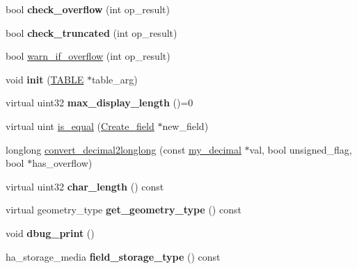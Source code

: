 \begin{DoxyCompactItemize}
\item 
\mbox{\label{classField_a0f30b16148651f543ac6ba6ddb3179f9}} 
bool {\bfseries check\+\_\+overflow} (int op\+\_\+result)
\item 
\mbox{\label{classField_a91ea426d1ddef963ca231392ef91d9ec}} 
bool {\bfseries check\+\_\+truncated} (int op\+\_\+result)
\item 
bool \mbox{\hyperlink{classField_a910faac3cd041daebe318e9dbf1d2297}{warn\+\_\+if\+\_\+overflow}} (int op\+\_\+result)
\item 
\mbox{\label{classField_a6a3873e28497e6928aa29f2a36502570}} 
void {\bfseries init} (\mbox{\hyperlink{structTABLE}{T\+A\+B\+LE}} $\ast$table\+\_\+arg)
\item 
\mbox{\label{classField_a2d0fa60640d919a674c31f5f2f6e3e05}} 
virtual uint32 {\bfseries max\+\_\+display\+\_\+length} ()=0
\item 
virtual uint \mbox{\hyperlink{classField_a8c99e9c66c1d578a339ae87d128843b7}{is\+\_\+equal}} (\mbox{\hyperlink{classCreate__field}{Create\+\_\+field}} $\ast$new\+\_\+field)
\item 
longlong \mbox{\hyperlink{classField_ae7b5281a68791e7d7ba3d5293a68c0cd}{convert\+\_\+decimal2longlong}} (const \mbox{\hyperlink{classmy__decimal}{my\+\_\+decimal}} $\ast$val, bool unsigned\+\_\+flag, bool $\ast$has\+\_\+overflow)
\item 
\mbox{\label{classField_aceaebba0a55dc7d6f09a1a84d8ca87e6}} 
virtual uint32 {\bfseries char\+\_\+length} () const
\item 
\mbox{\label{classField_a95fab536f079cca650b46408ab209d05}} 
virtual geometry\+\_\+type {\bfseries get\+\_\+geometry\+\_\+type} () const
\item 
\mbox{\label{classField_aa763ff927b8dc5b38cefe95338f3f17d}} 
void {\bfseries dbug\+\_\+print} ()
\item 
\mbox{\label{classField_a34c371a90d51635dd76ff50fa20bdb6c}} 
ha\+\_\+storage\+\_\+media {\bfseries field\+\_\+storage\+\_\+type} () const
\item 
\mbox{\label{classField_ab0077f98b733fd184aa451861f542ded}} 

\end{DoxyCompactItemize}
